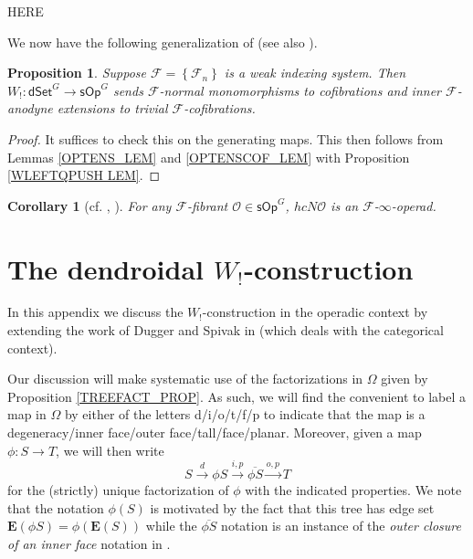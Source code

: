 \documentclass[a4paper,10pt
,draft
]{article}%
\numberwithin{equation}{section}
\numberwithin{figure}{section}
\newtheorem{proposition}[equation]{Proposition}%
\newtheorem{corollary}[equation]{Corollary}%
\theoremstyle{definition} %
\newcommand{\set}[1]{\left\{#1\right\}}%
\newcommand{\sOp}{\ensuremath{\mathsf{sOp}}}%
\newcommand{\dSet}{\mathsf{dSet}}
\newcommand{\F}{\ensuremath{\mathcal F}}
\renewcommand{\O}{\ensuremath{\mathcal O}}
\newcommand{\1}{\ensuremath{\mathbbm 1}}%
\begin{document}
{\color{red} HERE}




We now have the following generalization of \cite[Prop 4.5]{CM13b} (see also \cite[Prop. 6.15]{Per18}).


\begin{proposition}
	\label{W!_COF_PROP}
	Suppose $\F = \set{\F_n}$ is a weak indexing system.
	Then $W_!: \dSet^G \to \sOp^G$ sends $\F$-normal monomorphisms to cofibrations and inner $\F$-anodyne extensions to trivial $\F$-cofibrations.
\end{proposition}

\begin{proof}
	It suffices to check this on the generating maps.
	This then follows from
	Lemmas \ref{OPTENS_LEM} and \ref{OPTENSCOF_LEM} with Proposition \ref{WLEFTQPUSH LEM}.
\end{proof}




\begin{corollary}
	[{cf. \cite[Prop. 6.15]{Per18}, \cite[Cor. 4.6]{CM11}}]
	For any $\F$-fibrant $\O \in \sOp^G$, $h c N \O$ is an $\F$-$\infty$-operad.
\end{corollary}




\fi







\appendix







\section{The dendroidal $W_!$-construction}
\label{WCONS AP}



In this appendix we discuss the 
$W_!$-construction in the operadic context by extending the  
work of Dugger and Spivak in \cite{DS11} 
(which deals with the categorical context).


Our discussion will make systematic
use of the factorizations in $\Omega$ given by 
Proposition \ref{TREEFACT_PROP}.
As such, we will find the convenient to label a 
map in $\Omega$
by either of the letters d/i/o/t/f/p
to indicate that the map is
a degeneracy/inner face/outer face/tall/face/planar.
Moreover, given a map $\phi\colon S \to T$,
we will then write
\[
	S \xrightarrow{d}
	\phi S \xrightarrow{i,p}
	\overline{\phi S} \xrightarrow{o,p}
	T
\]
for the (strictly) unique 
factorization of $\phi$ with the indicated properties.
We note that the notation 
$\phi(S)$ is motivated by the fact that this tree has edge set
$\boldsymbol{E}(\phi S) = \phi (\boldsymbol{E}(S))$
while the 
$\overline{\phi S}$ notation is an instance of the 
\emph{outer closure of an inner face}
notation in \cite[Not. 2.14]{BP_edss}.
\end{document}
